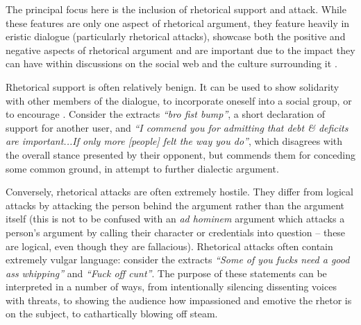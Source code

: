 The principal focus here is the inclusion of rhetorical support and attack. While these features are only one aspect of rhetorical argument, they feature heavily in eristic dialogue (particularly rhetorical attacks), showcase both the positive and negative aspects of rhetorical argument and are important due to the impact they can have within discussions on the social web and the culture surrounding it \citep{Blount2015}.

Rhetorical support is often relatively benign. It can be used to show solidarity with other members of the dialogue, to incorporate oneself into a social group, or to encourage . Consider the extracts \textit{``bro fist bump''}, a short declaration of support for another user, and \textit{``I commend you for admitting that debt \& deficits are important...If only more [people] felt the way you do''}, which disagrees with the overall stance presented by their opponent, but commends them for conceding some common ground, in attempt to further dialectic argument.

Conversely, rhetorical attacks are often extremely hostile. They differ from logical attacks by attacking the person behind the argument rather than the argument itself (this is not to be confused with an \textit{ad hominem} argument which attacks a person's argument by calling their character or credentials into question -- these are logical, even though they are fallacious). Rhetorical attacks often contain extremely vulgar language: consider the extracts \textit{``Some of you fucks need a good ass whipping''} and \textit{``Fuck off cunt''}.  The purpose of these statements can be interpreted in a number of ways, from intentionally silencing dissenting voices with threats, to showing the audience how impassioned and emotive the rhetor is on the subject, to cathartically blowing off steam.

